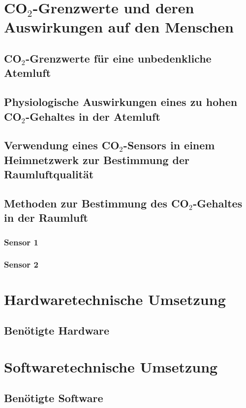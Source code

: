 \documentclass[a4paper,
    11pt,
    headings=small,
    ngerman,
    listof=totoc,
    numbers=noenddot]{scrreprt}[2021/11/13]
\begin{document}
\chapter{CO$_2$-Grenzwerte und deren Auswirkungen auf den Menschen}

\section{CO$_2$-Grenzwerte für eine unbedenkliche Atemluft}

\section{Physiologische Auswirkungen eines zu hohen CO$_2$-Gehaltes in der Atemluft}

\section{Verwendung eines CO$_2$-Sensors in einem Heimnetzwerk zur Bestimmung der Raumluftqualität}

\section{Methoden zur Bestimmung des CO$_2$-Gehaltes in der Raumluft}
\subsection{Sensor 1}
\subsection{Sensor 2}



\chapter{Hardwaretechnische Umsetzung}

\section{Benötigte Hardware}



\chapter{Softwaretechnische Umsetzung}

\section{Benötigte Software}
\end{document}
